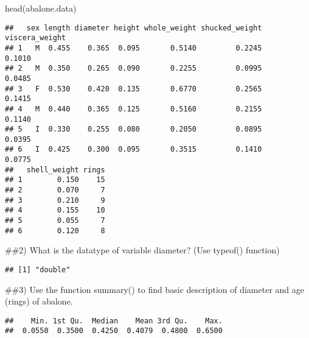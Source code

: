 \documentclass[
]{article}
\newenvironment{Shaded}{\begin{snugshade}}{\end{snugshade}}
\newcommand{\FunctionTok}[1]{\textcolor[rgb]{0.00,0.00,0.00}{#1}}
\newcommand{\NormalTok}[1]{#1}
\newcommand{\SpecialCharTok}[1]{\textcolor[rgb]{0.00,0.00,0.00}{#1}}
\begin{document}
\begin{Shaded}
\begin{Highlighting}[]
\FunctionTok{head}\NormalTok{(abalone.data)}
\end{Highlighting}
\end{Shaded}

\begin{verbatim}
##   sex length diameter height whole_weight shucked_weight viscera_weight
## 1   M  0.455    0.365  0.095       0.5140         0.2245         0.1010
## 2   M  0.350    0.265  0.090       0.2255         0.0995         0.0485
## 3   F  0.530    0.420  0.135       0.6770         0.2565         0.1415
## 4   M  0.440    0.365  0.125       0.5160         0.2155         0.1140
## 5   I  0.330    0.255  0.080       0.2050         0.0895         0.0395
## 6   I  0.425    0.300  0.095       0.3515         0.1410         0.0775
##   shell_weight rings
## 1        0.150    15
## 2        0.070     7
## 3        0.210     9
## 4        0.155    10
## 5        0.055     7
## 6        0.120     8
\end{verbatim}

\#\#2) What is the datatype of variable diameter? (Use typeof()
function)

\begin{Shaded}
\end{Shaded}

\begin{verbatim}
## [1] "double"
\end{verbatim}

\#\#3) Use the function summary() to find basic description of diameter
and age (rings) of abalone.

\begin{Shaded}
\end{Shaded}

\begin{verbatim}
##    Min. 1st Qu.  Median    Mean 3rd Qu.    Max. 
##  0.0550  0.3500  0.4250  0.4079  0.4800  0.6500
\end{verbatim}

\begin{Shaded}
\end{Shaded}
\end{document}
